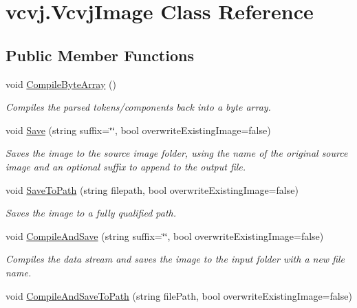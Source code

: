 \hypertarget{classvcvj_1_1_vcvj_image}{}\section{vcvj.\+Vcvj\+Image Class Reference}
\label{classvcvj_1_1_vcvj_image}
\subsection*{Public Member Functions}
\begin{DoxyCompactItemize}
\item 
void \hyperlink{classvcvj_1_1_vcvj_image_a8dfb7a8003fb52fe79c68fab3bfa4dec}{Compile\+Byte\+Array} ()
\begin{DoxyCompactList}\small\item\em Compiles the parsed tokens/components back into a byte array. \end{DoxyCompactList}\item 
void \hyperlink{classvcvj_1_1_vcvj_image_a9f88afceee83616e2e151ebc2029517a}{Save} (string suffix=\char`\"{}\char`\"{}, bool overwrite\+Existing\+Image=false)
\begin{DoxyCompactList}\small\item\em Saves the image to the source image folder, using the name of the original source image and an optional suffix to append to the output file. \end{DoxyCompactList}\item 
void \hyperlink{classvcvj_1_1_vcvj_image_a692bb3dc3559a89e866eacc78cb11c6d}{Save\+To\+Path} (string filepath, bool overwrite\+Existing\+Image=false)
\begin{DoxyCompactList}\small\item\em Saves the image to a fully qualified path. \end{DoxyCompactList}\item 
void \hyperlink{classvcvj_1_1_vcvj_image_a3672c362bd1e1422d7f2eae41e58bb2a}{Compile\+And\+Save} (string suffix=\char`\"{}\char`\"{}, bool overwrite\+Existing\+Image=false)
\begin{DoxyCompactList}\small\item\em Compiles the data stream and saves the image to the input folder with a new file name. \end{DoxyCompactList}\item 
void \hyperlink{classvcvj_1_1_vcvj_image_a92d372f81cb9dceb2d644f6f13c1d5bc}{Compile\+And\+Save\+To\+Path} (string file\+Path, bool overwrite\+Existing\+Image=false)

\end{DoxyCompactItemize}
